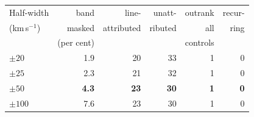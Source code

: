 \begin{tabular}{@{}lrrrrr@{}}
\hline
Half-width & band & line- & unatt- & outrank & recur- \\
(km\,s$^{-1}$) & masked & attributed & ributed & all & ring \\
 & (per cent) & & & controls & \\
\hline
$\pm20$ & 1.9 & 20 & 33 & 1 & 0 \\
$\pm25$ & 2.3 & 21 & 32 & 1 & 0 \\
\textbf{$\pm50$} & \textbf{4.3} & \textbf{23} & \textbf{30} & \textbf{1} & \textbf{0} \\
$\pm100$ & 7.6 & 23 & 30 & 1 & 0 \\
\hline
\end{tabular}

